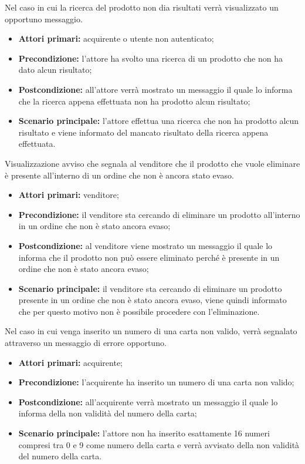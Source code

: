 
Nel caso in cui la ricerca del prodotto non dia risultati verrà visualizzato un opportuno messaggio.
\begin{itemize}
	\item \textbf{Attori primari:} acquirente o utente non autenticato;
	\item \textbf{Precondizione:} l'attore ha svolto una ricerca di un prodotto che non ha dato alcun risultato;
	\item \textbf{Postcondizione:} all'attore verrà mostrato un messaggio il quale lo informa che la ricerca appena effettuata non ha prodotto alcun risultato;
	\item \textbf{Scenario principale:} l'attore effettua una ricerca che non ha prodotto alcun risultato e viene informato del mancato risultato della ricerca appena effettuata.
\end{itemize}

Visualizzazione avviso che segnala al venditore che il prodotto che vuole eliminare è presente all'interno di un ordine che non è ancora stato evaso.
\begin{itemize}
    \item \textbf{Attori primari:} venditore;
    \item \textbf{Precondizione:} il venditore sta cercando di eliminare un prodotto all'interno in un ordine che non è stato ancora evaso;
    \item \textbf{Postcondizione:} al venditore viene mostrato un messaggio il quale lo informa che il prodotto non può essere eliminato perché è presente in un ordine che non è stato ancora evaso;
    \item \textbf{Scenario principale:} il venditore sta cercando di eliminare un prodotto presente in un ordine che non è stato ancora evaso, viene quindi informato che per questo motivo non è possibile procedere con l'eliminazione.
\end{itemize}

Nel caso in cui venga inserito un numero di una carta non valido, verrà segnalato attraverso un messaggio di errore opportuno.
\begin{itemize}
	\item \textbf{Attori primari:} acquirente;
	\item \textbf{Precondizione:} l'acquirente ha inserito un numero di una carta non valido;
	\item \textbf{Postcondizione:} all'acquirente verrà mostrato un messaggio il quale lo informa della non validità del numero della carta;
	\item \textbf{Scenario principale:} l'attore non ha inserito esattamente 16 numeri compresi tra 0 e 9 come numero della carta e verrà avvisato della non validità del numero della carta.
\end{itemize}

